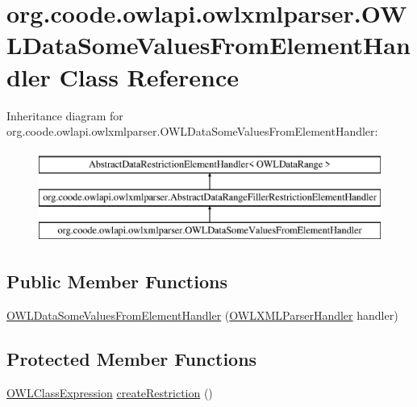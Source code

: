 \hypertarget{classorg_1_1coode_1_1owlapi_1_1owlxmlparser_1_1_o_w_l_data_some_values_from_element_handler}{\section{org.\-coode.\-owlapi.\-owlxmlparser.\-O\-W\-L\-Data\-Some\-Values\-From\-Element\-Handler Class Reference}
\label{classorg_1_1coode_1_1owlapi_1_1owlxmlparser_1_1_o_w_l_data_some_values_from_element_handler}
}
Inheritance diagram for org.\-coode.\-owlapi.\-owlxmlparser.\-O\-W\-L\-Data\-Some\-Values\-From\-Element\-Handler\-:\begin{figure}[H]
\begin{center}
\leavevmode
\includegraphics[height=3.000000cm]{classorg_1_1coode_1_1owlapi_1_1owlxmlparser_1_1_o_w_l_data_some_values_from_element_handler}
\end{center}
\end{figure}
\subsection*{Public Member Functions}
\begin{DoxyCompactItemize}
\item 
\hyperlink{classorg_1_1coode_1_1owlapi_1_1owlxmlparser_1_1_o_w_l_data_some_values_from_element_handler_a8e09cc961a2b25647e4616f0c692420c}{O\-W\-L\-Data\-Some\-Values\-From\-Element\-Handler} (\hyperlink{classorg_1_1coode_1_1owlapi_1_1owlxmlparser_1_1_o_w_l_x_m_l_parser_handler}{O\-W\-L\-X\-M\-L\-Parser\-Handler} handler)
\end{DoxyCompactItemize}
\subsection*{Protected Member Functions}
\begin{DoxyCompactItemize}
\item 
\hyperlink{interfaceorg_1_1semanticweb_1_1owlapi_1_1model_1_1_o_w_l_class_expression}{O\-W\-L\-Class\-Expression} \hyperlink{classorg_1_1coode_1_1owlapi_1_1owlxmlparser_1_1_o_w_l_data_some_values_from_element_handler_a0cc4878e6bdd8920690e77f165040c3f}{create\-Restriction} ()
\end{DoxyCompactItemize}


